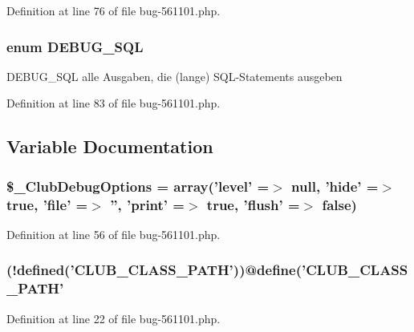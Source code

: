 \-Definition at line 76 of file bug-\/561101.\-php.

\hypertarget{bug-561101_8php_a66091a7bf636853e117ca3697950a4e2}{
\subsubsection[{\-D\-E\-B\-U\-G\-\_\-\-S\-Q\-L}]{\setlength{\rightskip}{0pt plus 5cm}enum {\bf \-D\-E\-B\-U\-G\-\_\-\-S\-Q\-L}}}\label{bug-561101_8php_a66091a7bf636853e117ca3697950a4e2}
\-D\-E\-B\-U\-G\-\_\-\-S\-Q\-L alle \-Ausgaben, die (lange) \-S\-Q\-L-\/\-Statements ausgeben 

\-Definition at line 83 of file bug-\/561101.\-php.



\subsection{\-Variable \-Documentation}
\hypertarget{bug-561101_8php_af5d7017e9118ddafbf3e4cdefd32f92d}{
\subsubsection[{\$\-\_\-\-Club\-Debug\-Options}]{\setlength{\rightskip}{0pt plus 5cm}\$\-\_\-\-Club\-Debug\-Options = array('level' =$>$ null, 'hide' =$>$ true, 'file' =$>$ '', '{\bf print}' =$>$ true, 'flush' =$>$ false)}}\label{bug-561101_8php_af5d7017e9118ddafbf3e4cdefd32f92d}


\-Definition at line 56 of file bug-\/561101.\-php.

\hypertarget{bug-561101_8php_ac28699d88a08562a63d8b34e6f2eeb26}{
\subsubsection[{if}]{(!defined('\-C\-L\-U\-B\-\_\-\-C\-L\-A\-S\-S\-\_\-\-P\-A\-T\-H'))@define('\-C\-L\-U\-B\-\_\-\-C\-L\-A\-S\-S\-\_\-\-P\-A\-T\-H'}}\label{bug-561101_8php_ac28699d88a08562a63d8b34e6f2eeb26}


\-Definition at line 22 of file bug-\/561101.\-php.

